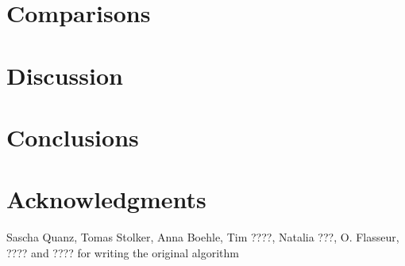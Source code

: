 \documentclass[twocolumn,fleqn]{aastex62}
\begin{document}
\section{Comparisons}
\section{Discussion}
\section{Conclusions}
\section*{Acknowledgments}
Sascha Quanz, Tomas Stolker, Anna Boehle, Tim ????, Natalia ???, O. Flasseur, ???? and ???? for writing the original algorithm


\end{document}
